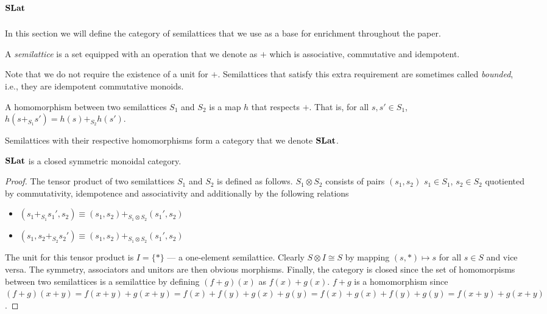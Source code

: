\section{$\mathbf{SLat}$}
\label{sec:appendix:1}

In this section we will define the category of semilattices that we use as a base for enrichment throughout the paper.

\begin{definition}[Semilattice]
    A \textit{semilattice} is a set equipped with an operation that we denote as $+$ which is associative, commutative and idempotent.
  \end{definition}
  
  Note that we do not require the existence of a unit for $+$. 
  Semilattices that satisfy this extra requirement are sometimes called \textit{bounded}, i.e., they are idempotent commutative monoids.
  
  \begin{definition}
  
  A homomorphism between two semilattices $S_{1}$ and $S_{2}$ is a map $h$ that respects $+$.
  That is, for all $s,s' \in S_{1}$, $h(s +_{S_{1}} s') = h(s) +_{S_{2}} h(s')$.
  \end{definition}
  
  \begin{definition}
    
  Semilattices with their respective homomorphisms form a category that we denote $\mathbf{SLat}$.
  \end{definition}
  
  \begin{proposition}
    $\mathbf{SLat}$ is a closed symmetric monoidal category.
  \end{proposition}
  \begin{proof}
    The tensor product of two semilattices $S_{1}$ and $S_{2}$ is defined as follows.
    $S_{1} \otimes S_{2}$ consists of pairs $(s_1,s_2)$ $s_{1} \in S_{1}$, $s_{2} \in S_{2}$ quotiented by commutativity, idempotence and associativity and additionally by the following relations
    \begin{itemize}
      \item $(s_{1} +_{S_{1}} s_{1}',s_{2}) \equiv (s_{1},s_{2}) +_{S_{1} \otimes S_{2}} (s_{1}',s_{2})$
      \item $(s_{1}, s_{2} +_{S_{2}} s_{2}') \equiv (s_{1},s_{2}) +_{S_{1} \otimes S_{2}} (s_{1}',s_{2})$
    \end{itemize}
  
    The unit for this tensor product is $I = \{*\}$ --- a one-element semilattice.
    Clearly $S \otimes I \cong S$ by mapping $(s,*) \mapsto s$ for all $s \in S$ and vice versa.
    The symmetry, associators and unitors are then obvious morphisms.
    Finally, the category is closed since the set of homomorpisms between two semilattices is a semilattice by defining $(f + g)(x)$ as $f(x) + g(x)$.
    $f + g$ is a homomorphism since $(f + g)(x+y) = f(x+y) + g(x+y) = f(x) + f(y) + g(x) + g(y) = f(x) + g(x) + f(y) + g(y) = f(x+y) + g(x+y)$.
  \end{proof}
  
